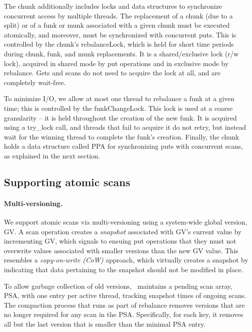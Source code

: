 The chunk additionally includes locks and data structures to synchronize concurrent access by multiple threads.
The replacement of a chunk (due to a split) or of a funk or munk associated with a given chunk 
must be executed atomically, and moreover, must be synchronized with concurrent puts. 
This is controlled by the chunk's rebalanceLock, which is held for short time periods
during chunk, funk, and munk replacements.  It is a shared/exclusive lock (r/w lock), acquired in shared mode 
by put operations and in exclusive mode by rebalance. Gets and scans do not need to acquire the lock at all,
and are completely wait-free.

To minimize I/O, we allow at most one thread to rebalance a funk at a given time; this is controlled by 
the  funkChangeLock. This lock is used at a coarse granularity -- it is held throughout the creation of the new funk. 
It is acquired using a try\_lock call, and threads that fail to acquire it do not retry, but instead wait for the winning thread 
to complete the funk's creation.
Finally, the chunk holds a data structure called PPA for synchronizing  puts with concurrent scans, as explained in the next section. 


\subsection{Supporting atomic scans}
\label{ssec:scans}


\paragraph{Multi-versioning.}

We support atomic scans via multi-versioning using a system-wide global version, GV. 
A scan operation creates a \emph{snapshot} associated with GV's current value by incrementing GV, 
which signals to ensuing put operations that they must not overwrite values associated with 
smaller versions than the new GV value.
This resembles a \emph{copy-on-write (CoW)} approach, which virtually creates a snapshot by 
indicating that data pertaining to the snapshot should not be modified in place.  

To allow garbage collection of old versions, \sys\  maintains 
a pending scan array, PSA, with one entry per active thread, tracking snapshot times of ongoing scans.
The compaction process that runs as part of rebalance removes versions that are no longer required for any  
scan in the PSA. Specifically, for each key, it removes all but the last version that is smaller than the minimal
PSA entry. 

